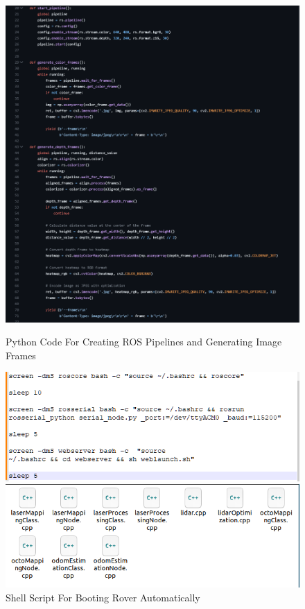 \documentclass[a4paper, 10pt]{article}
\begin{document}
    \begin{figure} [!h]
			\centering
			\includegraphics[scale=0.3]{Photos/ROSCodeTier3.png}
			\caption{Python Code For Creating ROS Pipelines and Generating Image Frames}
			\label{tier3_code}
			\hfill
			\begin{center}
			\includegraphics[scale=0.4]{Photos/ROSLaunchCodeTier3.png}
			\end{center}
			\caption{Shell Script For Booting Rover Automatically}
			\label{tier3_launch}
			\hfill
			\begin{center}
			\includegraphics[scale=0.4]{Photos/SLAM Files.png}

\end{center}
\end{figure}
\end{document}
